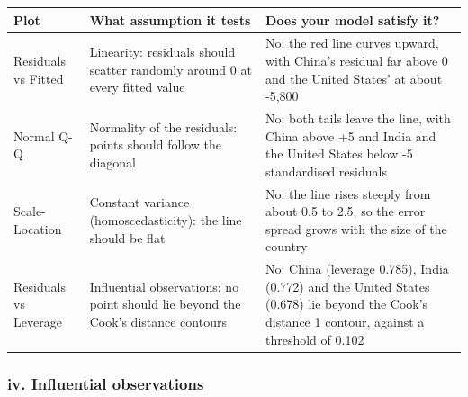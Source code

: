 \documentclass[
]{article}
\newcounter{none} %
\begin{document}
{\def\LTcaptype{none} %
\begin{longtable}[]{@{}
  >{\raggedright\arraybackslash}p{}
  >{\raggedright\arraybackslash}p{}
  >{\raggedright\arraybackslash}p{}@{}}
\toprule\noalign{}
\begin{minipage}[b]{\linewidth}\raggedright
Plot
\end{minipage} & \begin{minipage}[b]{\linewidth}\raggedright
What assumption it tests
\end{minipage} & \begin{minipage}[b]{\linewidth}\raggedright
Does your model satisfy it?
\end{minipage} \\
\midrule\noalign{}
\endhead
\bottomrule\noalign{}
\endlastfoot
Residuals vs Fitted & Linearity: residuals should scatter randomly
around 0 at every fitted value & No: the red line curves upward, with
China's residual far above 0 and the United States' at about -5,800 \\
Normal Q-Q & Normality of the residuals: points should follow the
diagonal & No: both tails leave the line, with China above +5 and India
and the United States below -5 standardised residuals \\
Scale-Location & Constant variance (homoscedasticity): the line should
be flat & No: the line rises steeply from about 0.5 to 2.5, so the error
spread grows with the size of the country \\
Residuals vs Leverage & Influential observations: no point should lie
beyond the Cook's distance contours & No: China (leverage 0.785), India
(0.772) and the United States (0.678) lie beyond the Cook's distance 1
contour, against a threshold of 0.102 \\
\end{longtable}
}

\subsubsection{iv. Influential
observations}\label{iv.-influential-observations}
\end{document}
